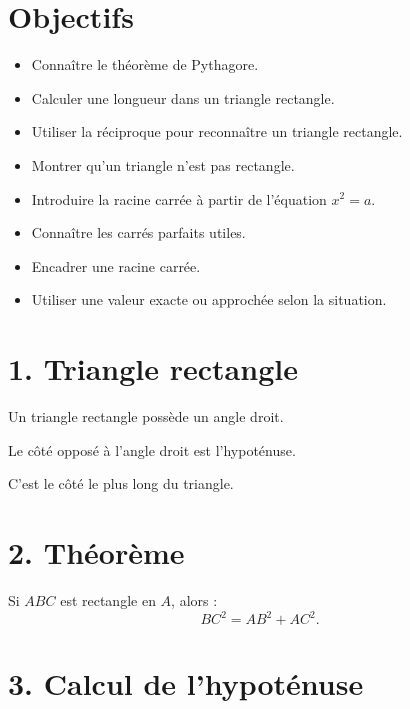 
\section{Objectifs}

\begin{itemize}
\item Connaître le théorème de Pythagore.
\item Calculer une longueur dans un triangle rectangle.
\item Utiliser la réciproque pour reconnaître un triangle rectangle.
\item Montrer qu'un triangle n'est pas rectangle.
\item Introduire la racine carrée à partir de l'équation $x^2=a$.
\item Connaître les carrés parfaits utiles.
\item Encadrer une racine carrée.
\item Utiliser une valeur exacte ou approchée selon la situation.
\end{itemize}

\section{1. Triangle rectangle}

Un triangle rectangle possède un angle droit.

Le côté opposé à l'angle droit est l'hypoténuse.

C'est le côté le plus long du triangle.

\section{2. Théorème}


\begin{propriete}
Si $ABC$ est rectangle en $A$, alors :
\[
\boxed{BC^2=AB^2+AC^2}.
\]
\end{propriete}

\section{3. Calcul de l'hypoténuse}

